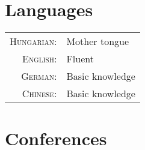 \documentclass[10pt]{article}
\begin{document}
\section*{Languages}
\begin{tabular}{rl}
\textsc{Hungarian:}&Mother tongue\\
\textsc{English:}&Fluent\\
\textsc{German:}&Basic knowledge\\
\textsc{Chinese:}&Basic knowledge\\
\end{tabular}


\section*{Conferences}





\end{document}

